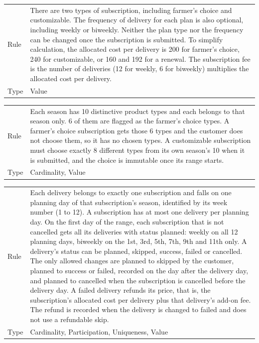 \begin{xltabular}{\linewidth}{@{}KY@{}}
Rule        & There are two types of subscription, including farmer's choice and customizable. The frequency of delivery for each plan is also optional, including weekly or biweekly. Neither the plan type nor the frequency can be changed once the subscription is submitted. To simplify calculation, the allocated cost per delivery is 200 for farmer's choice, 240 for customizable, or 160 and 192 for a renewal. The subscription fee is the number of deliveries (12 for weekly, 6 for biweekly) multiplies the allocated cost per delivery. \\
Type        & Value\\
\bottomrule
\end{xltabular}

\begin{xltabular}{\linewidth}{@{}KY@{}}
Rule        & Each season has 10 distinctive product types and each belongs to that season only. 6 of them are flagged as the farmer's choice types. A farmer's choice subscription gets those 6 types and the customer does not choose them, so it has no chosen types. A customizable subscription must choose exactly 8 different types from its own season's 10 when it is submitted, and the choice is immutable once its range starts.\\
Type        & Cardinality, Value\\
\bottomrule
\end{xltabular}

\begin{xltabular}{\linewidth}{@{}KY@{}}
Rule        & Each delivery belongs to exactly one subscription and falls on one planning day of that subscription's season, identified by its week number (1 to 12). A subscription has at most one delivery per planning day. On the first day of the range, each subscription that is not cancelled gets all its deliveries with status planned: weekly on all 12 planning days, biweekly on the 1st, 3rd, 5th, 7th, 9th and 11th only. A delivery's status can be planned, skipped, success, failed or cancelled. The only allowed changes are planned to skipped by the customer, planned to success or failed, recorded on the day after the delivery day, and planned to cancelled when the subscription is cancelled before the delivery day. A failed delivery refunds its price, that is, the subscription's allocated cost per delivery plus that delivery's add-on fee. The refund is recorded when the delivery is changed to failed and does not use a refundable skip. \\
Type        & Cardinality, Participation, Uniqueness, Value\\
\bottomrule
\end{xltabular}


